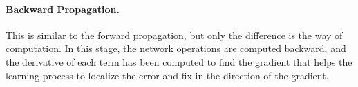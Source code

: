 \paragraph{Backward Propagation.} This is similar to the forward propagation, but only the difference is the way of computation. In this stage, the network operations are computed backward, and the derivative of each term has been computed to find the gradient that helps the learning process to localize the error and fix in the direction of the gradient.
